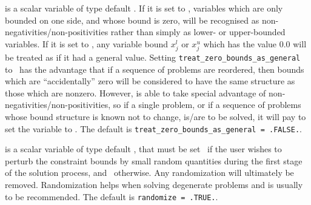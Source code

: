 \begin{description}
 is a scalar variable of type
default \logical.
If it is set to \false, variables which
are only bounded on one side, and whose bound is zero,
will be recognised as non-negativities/non-positivities rather than simply as
lower- or upper-bounded variables.
If it is set to \true, any variable bound
$x_{j}^{l}$ or $x_{j}^{u}$ which has the value 0.0 will be
treated as if it had a general value.
Setting {\tt treat\_zero\_bounds\_as\_general} to \true\ has the advantage
that if a sequence of problems are reordered, then bounds which are
``accidentally'' zero will be considered to have the same structure as
those which are nonzero. However, {\tt \fullpackagename} is
able to take special advantage of non-negativities/non-positivities, so
if a single problem, or if a sequence of problems whose
bound structure is known not to change, is/are to be solved,
it will pay to set the variable to \false.
The default is {\tt treat\_zero\_bounds\_as\_general = .FALSE.}.


 is a scalar variable of type default \logical, that
must be set \true\ if the user wishes to perturb the constraint bounds
by small random quantities during the first stage of the solution process,
and \false\ otherwise.
Any randomization will ultimately be removed. Randomization
helps when solving degenerate problems and is usually to be recommended.
The default is {\tt randomize = .TRUE.}.



\end{description}
